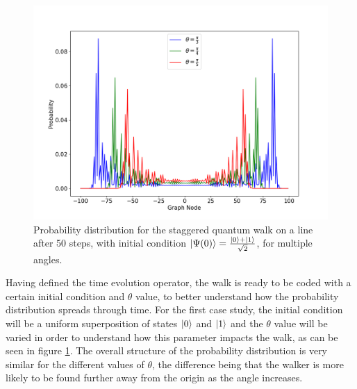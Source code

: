 \documentclass[../../dissertation.tex]{subfiles}
\begin{document}
\begin{figure}[!h]
	\centering
	\includegraphics[scale=0.40]{img/StagQuantumWalk/stagqwMultiple.png}
	\caption{Probability distribution for the staggered quantum walk on a line after 50 steps, with initial condition $\ket{\Psi(0)}=\frac{\ket{0}+\ket{1}}{\sqrt{2}}$, for multiple angles.} 
	\label{fig:stagQWSimulMultTheta}
\end{figure}
Having defined the time evolution operator, the walk is ready to be coded with
a certain initial condition and $\theta$ value, to better understand how the
probability distribution spreads through time. 
For the first case study, the initial condition will be a uniform superposition
of states $\ket{0}$ and $\ket{1}$ and the $\theta$ value will be varied in
order to understand how this parameter impacts the walk, as can be seen in
figure \ref{fig:stagQWSimulMultTheta}. The overall structure of the
probability distribution is very similar for the different values of $\theta$,
the difference being that the walker is more likely to be found further away
from the origin as the angle increases.\par
\end{document}
